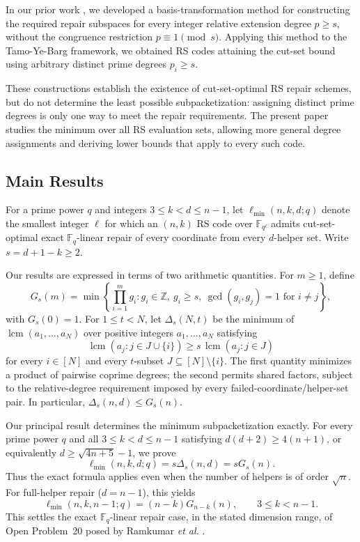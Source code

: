 \documentclass[11pt,onecolumn]{IEEEtran}
\newcommand{\F}{\mathbb{F}}
\newcommand{\lcmop}{\operatorname{lcm}}
\newcommand{\ellmin}{\ell_{\min}}
\begin{document}
In our prior work \cite{Qiu2026}, we developed a
basis-transformation method for constructing the required repair
subspaces for every integer relative extension degree $p\ge s$,
without the congruence restriction $p\equiv1\pmod s$.
Applying this method to the Tamo-Ye-Barg framework, we obtained
RS codes attaining the cut-set bound using arbitrary distinct prime
degrees $p_i\ge s$.

These constructions establish the existence of cut-set-optimal RS
repair schemes, but do not determine the least possible subpacketization:
assigning distinct prime degrees is only one way to meet the repair
requirements.  The present paper studies the minimum over all RS
evaluation sets, allowing more general degree assignments and deriving
lower bounds that apply to every such code.


\subsection{Main Results}
For a prime power $q$ and integers $3\le k<d\le n-1$, let
$\ellmin(n,k,d;q)$ denote the smallest integer $\ell$ for which
an $(n,k)$ RS code over $\mathbb F_{q^\ell}$ admits cut-set-optimal
exact $\F_q$-linear repair of every coordinate from every
$d$-helper set.  Write
$s=d+1-k\ge2$.

Our results are expressed in terms of two arithmetic quantities.
For $m\ge1$, define
\[
G_s(m)=\min\left\{\prod_{i=1}^m g_i:
  g_i\in\mathbb Z,\ g_i\ge s,\
  \gcd(g_i,g_j)=1\text{ for }i\ne j\right\},
\]
with $G_s(0)=1$.  For $1\le t<N$, let $\Delta_s(N,t)$ be the
minimum of $\lcmop(a_1,\ldots,a_N)$ over positive integers
$a_1,\ldots,a_N$ satisfying
\begin{equation}
\lcmop(a_j:j\in J\cup\{i\})
\ge s\,\lcmop(a_j:j\in J)
\label{eq:intro-Delta-feasible}
\end{equation}
for every $i\in[N]$ and every $t$-subset
$J\subseteq[N]\setminus\{i\}$.
The first quantity minimizes a product of pairwise coprime degrees;
the second permits shared factors, subject to the relative-degree
requirement imposed by every failed-coordinate/helper-set pair.
In particular, $\Delta_s(n,d)\le G_s(n)$.

Our principal result determines the minimum subpacketization exactly.
For every prime power $q$ and all $3\le k<d\le n-1$ satisfying
$d(d+2)\geq 4(n+1)$, or equivalently
$d\ge\sqrt{4n+5}-1$, we prove
\begin{equation}
\ellmin(n,k,d;q)=s\Delta_s(n,d)=sG_s(n).
\label{eq:intro-main-exact}
\end{equation}
Thus the exact formula applies even when the number of helpers is
of order $\sqrt n$.
For full-helper repair ($d=n-1$), this yields
\[
\ellmin(n,k,n-1;q)=(n-k)G_{n-k}(n),
\qquad 3\le k<n-1.
\]
This settles the exact $\F_q$-linear repair case, in the stated
dimension range, of Open Problem~20 posed by Ramkumar \emph{et al.}
\cite[Open Problem~20]{RamkumarEtAl2022}.
\end{document}
